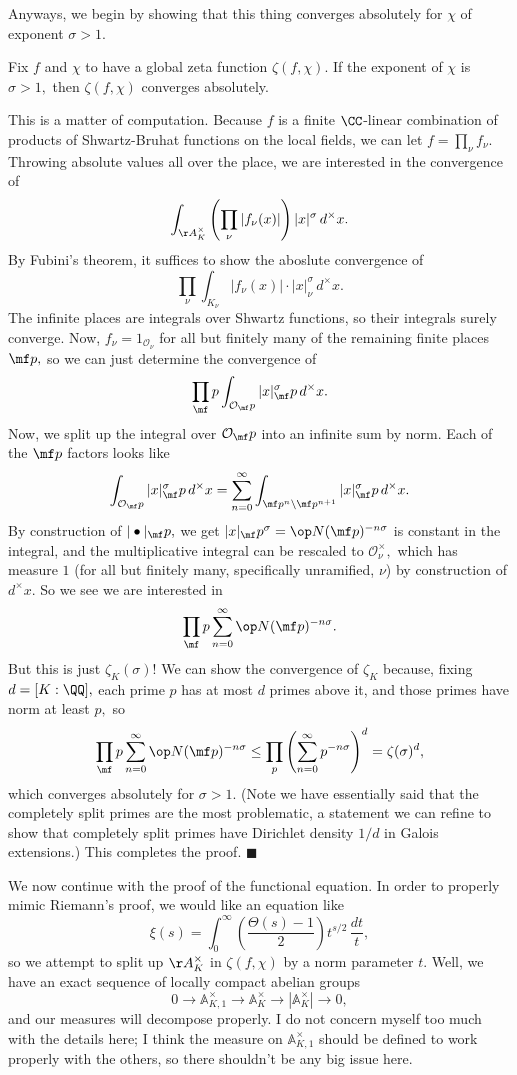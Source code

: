 Anyways, we begin by showing that this thing converges absolutely for $\chi$ of exponent $\sigma>1.$
\begin{lemma}
    Fix $f$ and $\chi$ to have a global zeta function $\zeta(f,\chi).$ If the exponent of $\chi$ is $\sigma>1,$ then $\zeta(f,\chi)$ converges absolutely.
\end{lemma}
This is a matter of computation. Because $f$ is a finite $\CC$-linear combination of products of Shwartz-Bruhat functions on the local fields, we can let $f=\prod_\nu f_\nu.$ Throwing absolute values all over the place, we are interested in the convergence of
\[\int_{\AA_K^\times}\left(\prod_\nu|f_\nu(x)|\right)|x|^\sigma\,d^\times x.\]
By Fubini's theorem, it suffices to show the aboslute convergence of
\[\prod_\nu\int_{K_\nu}|f_\nu(x)|\cdot|x|^\sigma_\nu\,d^\times x.\]
The infinite places are integrals over Shwartz functions, so their integrals surely converge. Now, $f_\nu=1_{\mathcal O_\nu}$ for all but finitely many of the remaining finite places $\mf p,$ so we can just determine the convergence of
\[\prod_\mf p\int_{\mathcal O_\mf p}|x|^\sigma_\mf p\,d^\times x.\]
Now, we split up the integral over $\mathcal O_\mf p$ into an infinite sum by norm. Each of the $\mf p$ factors looks like
\[\int_{\mathcal O_\mf p}|x|^\sigma_\mf p\,d^\times x=\sum_{n=0}^\infty\int_{\mf p^n\setminus\mf p^{n+1}}|x|^\sigma_\mf p\,d^\times x.\]
By construction of $|\bullet|_\mf p,$ we get $|x|_\mf p^\sigma=\op N(\mf p)^{-n\sigma}$ is constant in the integral, and the multiplicative integral can be rescaled to $\mathcal O_\nu^\times,$ which has measure $1$ (for all but finitely many, specifically unramified, $\nu$) by construction of $d^\times x.$ So we see we are interested in
\[\prod_\mf p\sum_{n=0}^\infty\op N(\mf p)^{-n\sigma}.\]
But this is just $\zeta_K(\sigma)$! We can show the convergence of $\zeta_K$ because, fixing $d=[K:\QQ],$ each prime $p$ has at most $d$ primes above it, and those primes have norm at least $p,$ so
\[\prod_\mf p\sum_{n=0}^\infty\op N(\mf p)^{-n\sigma}\le\prod_p\left(\sum_{n=0}^\infty p^{-n\sigma}\right)^d=\zeta(\sigma)^d,\]
which converges absolutely for $\sigma>1.$ (Note we have essentially said that the completely split primes are the most problematic, a statement we can refine to show that completely split primes have Dirichlet density $1/d$ in Galois extensions.) This completes the proof. $\blacksquare$

We now continue with the proof of the functional equation. In order to properly mimic Riemann's proof, we would like an equation like
\[\xi(s)=\int_0^\infty\left(\frac{\Theta(s)-1}2\right)t^{s/2}\,\frac{dt}t,\]
so we attempt to split up $\AA^\times_K$ in $\zeta(f,\chi)$ by a norm parameter $t.$ Well, we have an exact sequence of locally compact abelian groups
\[0\longrightarrow\mathbb A^\times_{K,1}\longrightarrow\mathbb A_K^\times\longrightarrow\left|\mathbb A_K^\times\right|\longrightarrow0,\]
and our measures will decompose properly. I do not concern myself too much with the details here; I think the measure on $\mathbb A^\times_{K,1}$ should be defined to work properly with the others, so there shouldn't be any big issue here.

